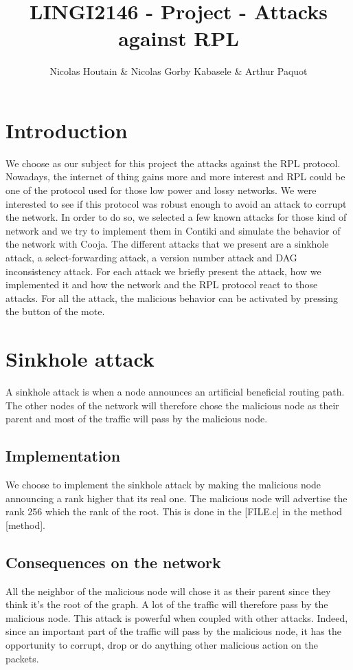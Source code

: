 \documentclass{report}
\title{LINGI2146 - Project - Attacks against RPL}
\author{Nicolas Houtain \& Nicolas Gorby Kabasele \& Arthur Paquot}
\begin{document}
\maketitle
\section{Introduction}
We choose as our subject for this project the attacks against the RPL protocol. Nowadays, the internet of thing gains more and more interest and RPL could be one of the protocol used for those low power and lossy networks. We were interested to see if this protocol was robust enough to avoid an attack to corrupt the network. In order to do so, we selected a few known attacks for those kind of network and we try to implement them in Contiki and simulate the behavior of the network with Cooja. The different attacks that we present are a sinkhole attack, a select-forwarding attack, a version number attack and DAG inconsistency attack. For each attack we briefly present the attack, how we implemented it and how the network and the RPL protocol react to those attacks. For all the attack, the malicious behavior can be activated by pressing the button of the mote.
\section{Sinkhole attack}
A sinkhole attack is when a node announces an artificial beneficial routing path. The other nodes of the network will therefore chose the malicious node as their parent and most of the traffic will pass by the malicious node.
\subsection*{Implementation}
We choose to implement the sinkhole attack by making the malicious node announcing a rank higher that its real one. The malicious node will advertise the rank 256 which the rank of the root. This is done in the [FILE.c] in the method [method].
\subsection*{Consequences on the network}
All the neighbor of the malicious node will chose it as their parent since they think it's the root of the graph. A lot of the traffic will therefore pass by the malicious node. This attack is powerful when coupled with other attacks. Indeed, since an important part of the traffic will pass by the malicious node, it has the opportunity to corrupt, drop or do anything other malicious action on the packets.
\end{document}
